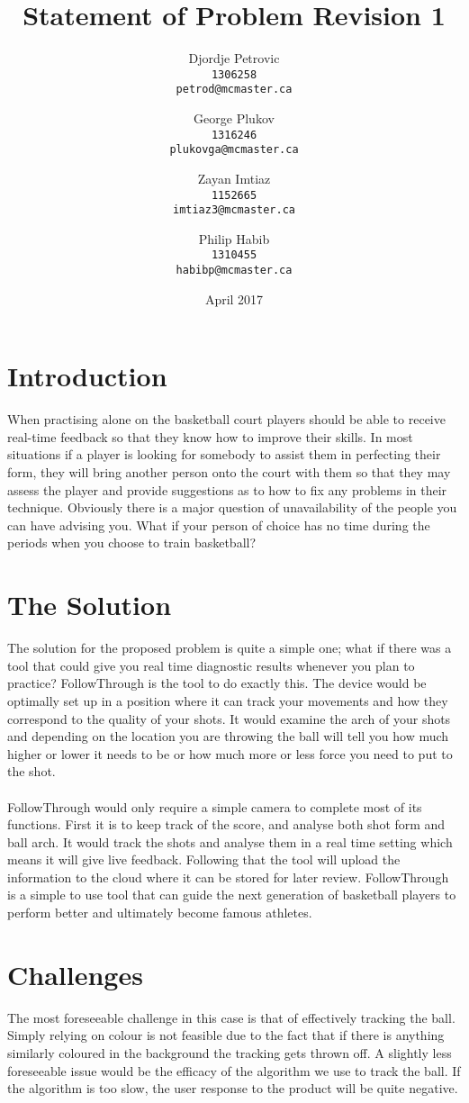 \documentclass{article}
\title{Statement of Problem Revision 1}
\author{
  Djordje Petrovic\\ \texttt{1306258}\\ \texttt{petrod@mcmaster.ca} \and George Plukov\\ \texttt{1316246}\\ \texttt{plukovga@mcmaster.ca} \and Zayan Imtiaz\\ \texttt{1152665}\\ \texttt{imtiaz3@mcmaster.ca} \and Philip Habib \\ \texttt{1310455}\\ \texttt{habibp@mcmaster.ca}
}
\date{April 2017}
\begin{document}
\maketitle
\newpage

\section{Introduction}
When practising alone on the basketball court players should be able to receive real-time feedback so that they know how to improve their skills. In most situations if a player is looking for somebody to assist them in perfecting their form, they will bring another person onto the court with them so that they may assess the player and provide suggestions as to how to fix any problems in their technique. Obviously there is a major question of unavailability of the people you can have advising you. What if your person of choice has no time during the periods when you choose to train basketball?

\section{The Solution}
The solution for the proposed problem is quite a simple one; what if there was a tool that could give you real time diagnostic results whenever you plan to practice? FollowThrough is the tool to do exactly this. The device would be optimally set up in a position where it can track your movements and how they correspond to the quality of your shots. It would examine the arch of your shots and depending on the location you are throwing the ball will tell you how much higher or lower it needs to be or how much more or less force you need to put to the shot.
\\ \\
FollowThrough would only require a simple camera to complete most of its functions. First it is to keep track of the score, and analyse both shot form and ball arch. It would track the shots and analyse them in a real time setting which means it will give live feedback. Following that the tool 
will upload the information to the cloud where it can be stored for later review. FollowThrough is a simple to use tool that can guide the next generation of basketball players to perform better and ultimately become famous athletes.

\section{Challenges}
The most foreseeable challenge in this case is that of effectively tracking the ball. Simply relying on colour is not feasible due to the fact that if there is anything similarly coloured in the background the tracking gets thrown off. A slightly less foreseeable issue would be the efficacy of the algorithm we use to track the ball. If the algorithm is too slow, the user response to the product will be quite negative.
\end{document}
